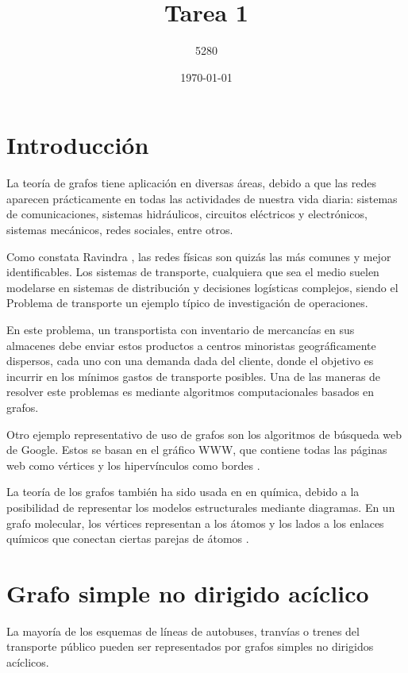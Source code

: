 \documentclass{article}
\title{Tarea 1}
\author{5280}
\date{\today}
\begin{document}
\maketitle

\section*{Introducción}

La teoría de grafos tiene aplicación en diversas áreas, debido a que las redes aparecen prácticamente en todas las actividades de nuestra vida diaria: sistemas de comunicaciones, sistemas hidráulicos, circuitos eléctricos y electrónicos, sistemas mecánicos, redes sociales, entre otros. 

Como constata Ravindra \cite{ahuja2017network}, las redes físicas son quizás las más comunes y mejor identificables. Los sistemas de transporte, cualquiera que sea el medio suelen modelarse en sistemas de distribución  y decisiones logísticas complejos, siendo el Problema de transporte un ejemplo típico de investigación de operaciones. 

En este problema, un transportista con inventario de mercancías en sus almacenes debe enviar estos productos a centros minoristas geográficamente dispersos, cada uno con una demanda dada del cliente, donde el objetivo es incurrir en los mínimos gastos de transporte posibles. Una de las maneras de resolver este problemas es mediante algoritmos computacionales basados en grafos.

Otro ejemplo representativo de uso de grafos son los algoritmos de búsqueda web de Google. Estos se basan en el gráfico WWW, que contiene todas las páginas web como vértices y los  hipervínculos como bordes \cite{chung2010graph}.

La teoría de los grafos también ha sido usada en en química, debido a la posibilidad de representar los modelos estructurales mediante diagramas. En un grafo molecular, los vértices representan a los átomos y los lados a los enlaces químicos que conectan ciertas parejas de átomos \cite{amador}.

\section{Grafo simple no dirigido acíclico}

La mayoría de los esquemas de líneas de autobuses, tranvías o trenes del transporte público pueden ser representados por grafos simples no dirigidos acíclicos.
\end{document}
